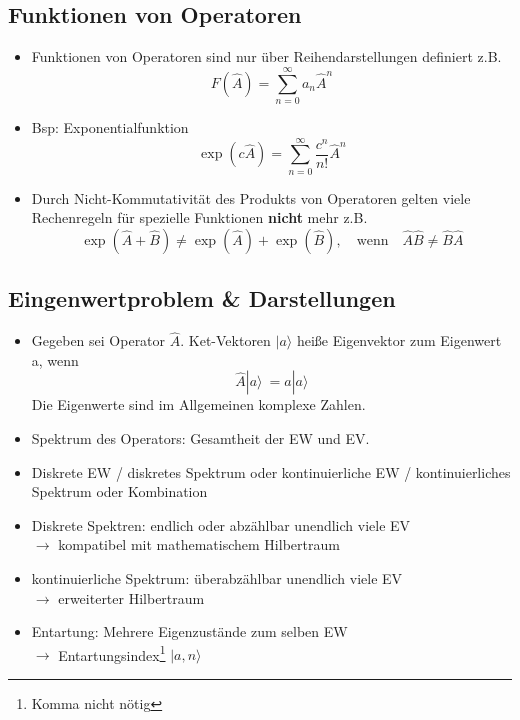 \documentclass[10pt,article,colorback,accentcolor=tud9d]{scrartcl}
\begin{document}
\subsection{Funktionen von Operatoren}
\begin{itemize}
  \item Funktionen von Operatoren sind nur über Reihendarstellungen definiert z.B.
    \begin{equation}
    F(\hat{A})=\sum^\infty_{n=0}a_n\hat{A}^n
    \end{equation}
  \item Bsp: Exponentialfunktion
    \begin{equation}
    \exp(c\hat{A})= \sum^\infty_{n=0}\frac{c^n}{n!}\hat{A}^n
    \end{equation}
  \item Durch Nicht-Kommutativität des Produkts von Operatoren gelten viele Rechenregeln für spezielle Funktionen \textbf{nicht} mehr z.B.
  \begin{equation}
  \exp(\hat{A}+\hat{B})\neq \exp(\hat{A}) +\exp(\hat{B}), \quad \text{wenn} \quad \hat{A}\hat{B} \neq \hat{B}\hat{A}
  \end{equation}
\end{itemize}
\subsection{Eingenwertproblem \& Darstellungen}
\begin{itemize}
  \item Gegeben sei Operator $\hat{A}$. Ket-Vektoren $\left.\right|a\rangle $ heiße Eigenvektor zum Eigenwert a, wenn
    \begin{equation}
    \hat{A}\left.\right|a\rangle  \ = a\left.\right|a\rangle 
    \end{equation}
    Die Eigenwerte sind im Allgemeinen komplexe Zahlen.
  \item Spektrum des Operators: Gesamtheit der EW und EV.
  \item Diskrete EW / diskretes Spektrum oder kontinuierliche EW / kontinuierliches Spektrum oder Kombination
  \item Diskrete Spektren: endlich oder abzählbar unendlich viele EV\\
    $\rightarrow$ kompatibel mit mathematischem Hilbertraum
  \item kontinuierliche Spektrum: überabzählbar unendlich viele EV\\
    $\rightarrow$ erweiterter Hilbertraum
  \item Entartung: Mehrere Eigenzustände zum selben EW\\
    $\rightarrow$ Entartungsindex\footnote{Komma nicht nötig} $\left.\right|a,n\rangle $
\end{itemize}
\end{document}
